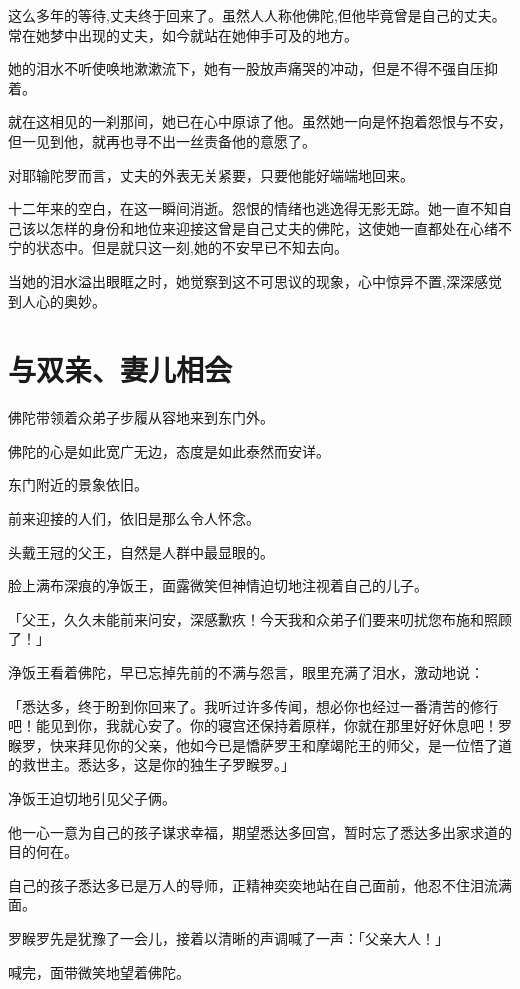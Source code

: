 \documentclass[twoside,openany]{book}
\begin{document}
这么多年的等待,丈夫终于回来了。虽然人人称他佛陀,但他毕竟曾是自己的丈夫。常在她梦中出现的丈夫，如今就站在她伸手可及的地方。

她的泪水不听使唤地漱漱流下，她有一股放声痛哭的冲动，但是不得不强自压抑着。

就在这相见的一刹那间，她已在心中原谅了他。虽然她一向是怀抱着怨恨与不安，但一见到他，就再也寻不出一丝责备他的意愿了。

对耶输陀罗而言，丈夫的外表无关紧要，只要他能好端端地回来。

十二年来的空白，在这一瞬间消逝。怨恨的情绪也逃逸得无影无踪。她一直不知自己该以怎样的身份和地位来迎接这曾是自己丈夫的佛陀，这使她一直都处在心绪不宁的状态中。但是就只这一刻,她的不安早已不知去向。

当她的泪水溢出眼眶之时，她觉察到这不可思议的现象，心中惊异不置,深深感觉到人心的奥妙。

\section{与双亲、妻儿相会}\label{sec8.3}

佛陀带领着众弟子步履从容地来到东门外。

佛陀的心是如此宽广无边，态度是如此泰然而安详。

东门附近的景象依旧。

前来迎接的人们，依旧是那么令人怀念。

头戴王冠的父王，自然是人群中最显眼的。

脸上满布深痕的净饭王，面露微笑但神情迫切地注视着自己的儿子。

「父王，久久未能前来问安，深感歉疚！今天我和众弟子们要来叨扰您布施和照顾了！」

浄饭王看着佛陀，早已忘掉先前的不满与怨言，眼里充满了泪水，激动地说：

「悉达多，终于盼到你回来了。我听过许多传闻，想必你也经过一番清苦的修行吧！能见到你，我就心安了。你的寝宫还保持着原样，你就在那里好好休息吧！罗睺罗，快来拜见你的父亲，他如今已是憍萨罗王和摩竭陀王的师父，是一位悟了道的救世主。悉达多，这是你的独生子罗睺罗。」

净饭王迫切地引见父子俩。

他一心一意为自己的孩子谋求幸福，期望悉达多回宫，暂时忘了悉达多出家求道的目的何在。

自己的孩子悉达多已是万人的导师，正精神奕奕地站在自己面前，他忍不住泪流满面。

罗睺罗先是犹豫了一会儿，接着以清晰的声调喊了一声：「父亲大人！」

喊完，面带微笑地望着佛陀。
\end{document}
